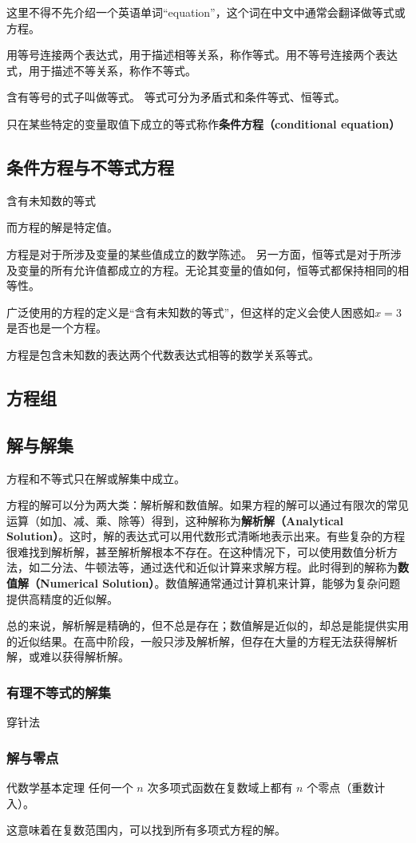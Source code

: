 这里不得不先介绍一个英语单词“equation”，这个词在中文中通常会翻译做等式或方程。

用等号连接两个表达式，用于描述相等关系，称作等式。用不等号连接两个表达式，用于描述不等关系，称作不等式。%

含有等号的式子叫做等式。 等式可分为矛盾式和条件等式、恒等式。

只在某些特定的变量取值下成立的等式称作\textbf{条件方程（conditional equation）}




\subsection{条件方程与不等式方程}

含有未知数的等式


而方程的解是特定值。


方程是对于所涉及变量的某些值成立的数学陈述。
另一方面，恒等式是对于所涉及变量的所有允许值都成立的方程。无论其变量的值如何，恒等式都保持相同的相等性。

广泛使用的方程的定义是“含有未知数的等式”，但这样的定义会使人困惑如$x=3$是否也是一个方程。

方程是包含未知数的表达两个代数表达式相等的数学关系等式。


\subsection{方程组}

\subsection{解与解集}

方程和不等式只在解或解集中成立。

方程的解可以分为两大类：解析解和数值解。如果方程的解可以通过有限次的常见运算（如加、减、乘、除等）得到，这种解称为\textbf{解析解（Analytical Solution）}。这时，解的表达式可以用代数形式清晰地表示出来。有些复杂的方程很难找到解析解，甚至解析解根本不存在。在这种情况下，可以使用数值分析方法，如二分法、牛顿法等，通过迭代和近似计算来求解方程。此时得到的解称为\textbf{数值解（Numerical Solution）}。数值解通常通过计算机来计算，能够为复杂问题提供高精度的近似解。

总的来说，解析解是精确的，但不总是存在；数值解是近似的，却总是能提供实用的近似结果。在高中阶段，一般只涉及解析解，但存在大量的方程无法获得解析解，或难以获得解析解。

\subsubsection{有理不等式的解集}

穿针法

\subsubsection{解与零点}

\begin{definition}{代数学基本定理}
任何一个 $n$ 次多项式函数在复数域上都有 $n$ 个零点（重数计入）。
\end{definition}
这意味着在复数范围内，可以找到所有多项式方程的解。



